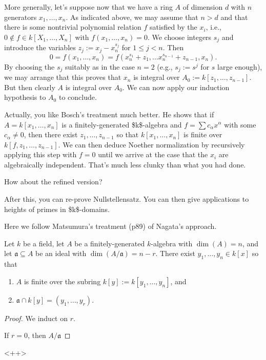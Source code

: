\documentclass[10pt]{article}
\begin{document}
More generally,
let's suppose now that we have
a ring \(A\) of dimension \(d\)
with \(n\) generators \(x_1,\dotsc,x_n\).
As indicated above,
we may assume that \(n > d\)
and that there is some nontrivial polynomial relation
\(f\) satisfied by the \(x_i\),
i.e.,
\(0 \notin f \in k[X_1,\dotsc,X_n]\)
with \(f(x_1,\dotsc,x_n) = 0\).
We choose integers \(s_j\) and introduce the variables
\(z_j := x_j - x_n^{s_j}\) for \(1 \leq j < n\).
Then
\[
    0 = f(x_1,\dotsc,x_n)
    =
    f(x_n^{s_1} + z_1,
    \dotsc
    x_n^{s_{n-1}} + z_{n-1},
    x_n).
  \]
By choosing the \(s_j\) suitably
as in the case \(n = 2\) (e.g.,
\(s_j := s^j\) for \(s\) large enough),
we may arrange that this proves
that
\(x_n\) is integral
over \(A_0 := k[z_1,\dotsc,z_{n-1}]\).
But then clearly \(A\) is integral over \(A_0\).
We can now apply our induction hypothesis to \(A_0\) to conclude.

Actually, you like Bosch's treatment much better.
He shows that if \(A = k[x_1,\dotsc,x_n]\) is a finitely-generated
\$k\$-algebra
and \(f = \sum c_\alpha x^\alpha\)
with some \(c_\alpha \neq 0\),
then there exist \(z_1,\dotsc,z_{n-1}\)
so that \(k[x_1,\dotsc,x_n]\)
is finite over \(k[f,z_1,\dotsc,z_{n-1}]\).
We can then deduce Noether normalization
by recursively applying this step 
with \(f = 0\)
until we arrive at the case
that the \(x_i\) are algebraically independent.
That's much less clunky than what you had done.


How about the refined version?


After this, you can re-prove Nullstellensatz.
You can then give applications
to heights of primes in \$k\$-domains.


Here we follow Matsumura's treatment (p89)
of Nagata's approach.

\begin{theorem}
  Let $k$ be a field, let $A$ be a finitely-generated
  $k$-algebra with $\dim(A) = n$,
  and let $\mathfrak{a} \subseteq A$ be an ideal
  with $\dim(A/\mathfrak{a}) = n-r$.
  There exist $y_1,\dotsc,y_n \in k[x]$
  so that
  \begin{enumerate}
  \item $A$ is finite over the subring $k[y] := k[y_1,\dotsc,y_n]$, and
  \item $\mathfrak{a} \cap k[y] = (y_1,\dotsc,y_r)$.
  \end{enumerate}
\end{theorem}
\begin{proof}
  We induct on $r$.

  If $r = 0$,
  then $A/\mathfrak{a}$
\end{proof}<++>
\end{document}

